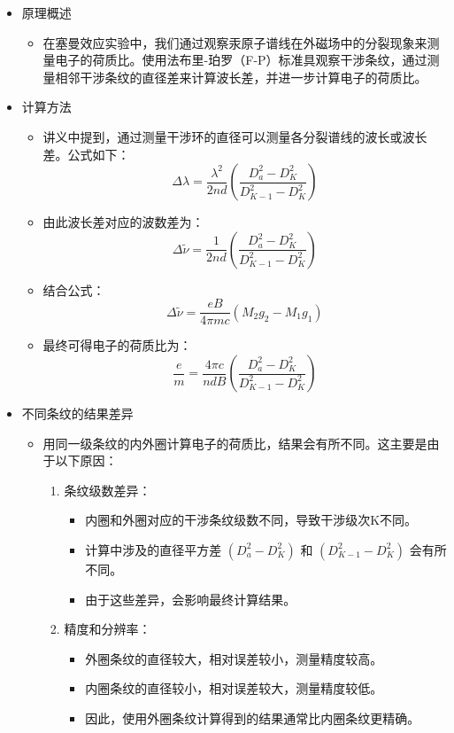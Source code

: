 \documentclass[dvipsnames, svgnames,a4paper,11pt]{article}
\begin{document}
	\begin{itemize}
		\item 原理概述
		\begin{itemize}
			\item 在塞曼效应实验中，我们通过观察汞原子谱线在外磁场中的分裂现象来测量电子的荷质比。使用法布里-珀罗（F-P）标准具观察干涉条纹，通过测量相邻干涉条纹的直径差来计算波长差，并进一步计算电子的荷质比。
		\end{itemize}
		
		\item 计算方法
		\begin{itemize}
			\item 讲义中提到，通过测量干涉环的直径可以测量各分裂谱线的波长或波长差。公式如下：
			\[
			\Delta \lambda = \frac{\lambda^2}{2nd} \left( \frac{D_{a}^2 - D_{K}^2}{D_{K-1}^2 - D_{K}^2} \right)
			\]
			
			\item 由此波长差对应的波数差为：
			\[
			\Delta \tilde{\nu} = \frac{1}{2nd} \left( \frac{D_{a}^2 - D_{K}^2}{D_{K-1}^2 - D_{K}^2} \right)
			\]
			
			\item 结合公式：
			\[
			\Delta \tilde{\nu} = \frac{eB}{4\pi m c} (M_2 g_2 - M_1 g_1)
			\]
			
			\item 最终可得电子的荷质比为：
			\[
			\frac{e}{m} = \frac{4\pi c}{ndB} \left( \frac{D_{a}^2 - D_{K}^2}{D_{K-1}^2 - D_{K}^2} \right)
			\]
		\end{itemize}
		
		\item 不同条纹的结果差异
		\begin{itemize}
			\item 用同一级条纹的内外圈计算电子的荷质比，结果会有所不同。这主要是由于以下原因：
			\begin{enumerate}
				\item 条纹级数差异：
				\begin{itemize}
					\item 内圈和外圈对应的干涉条纹级数不同，导致干涉级次K不同。
					\item 计算中涉及的直径平方差 \((D_{a}^2 - D_{K}^2)\) 和 \((D_{K-1}^2 - D_{K}^2)\) 会有所不同。
					\item 由于这些差异，会影响最终计算结果。
				\end{itemize}
				
				\item 精度和分辨率：
				\begin{itemize}
					\item 外圈条纹的直径较大，相对误差较小，测量精度较高。
					\item 内圈条纹的直径较小，相对误差较大，测量精度较低。
					\item 因此，使用外圈条纹计算得到的结果通常比内圈条纹更精确。
				\end{itemize}
				

\end{enumerate}
\end{itemize}
\end{itemize}
\end{document}
